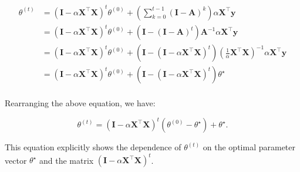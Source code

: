 \begin{align*}
    \theta^{(t)} & = (\mathbf{I} - \alpha \boldsymbol{X}^\top \boldsymbol{X})^t \theta^{(0)}  + \left( \sum_{k=0}^{t-1} (\boldsymbol{I} -  \mathbf{A})^k \right)  \alpha \boldsymbol{X} ^\top \boldsymbol{y}                                                              \\
                 & = (\mathbf{I} - \alpha \boldsymbol{X}^\top \boldsymbol{X})^t \theta^{(0)}  + (\mathbf{I}- (\mathbf{I} - \mathbf{A})^t) \mathbf{A}^{-1} \alpha \boldsymbol{X} ^\top \boldsymbol{y}                                                                      \\
                 & = (\mathbf{I} - \alpha \boldsymbol{X}^\top \boldsymbol{X})^t \theta^{(0)}  + (\mathbf{I}- (\mathbf{I} - \alpha \boldsymbol{X}^\top \boldsymbol{X})^t) \left(\frac{1}{\alpha} \bm{X}^\top \bm{X}\right)^{-1} \alpha \boldsymbol{X} ^\top \boldsymbol{y} \\
                 & = (\mathbf{I} - \alpha \boldsymbol{X}^\top \boldsymbol{X})^t \theta^{(0)}  + (\mathbf{I}- (\mathbf{I} - \alpha \boldsymbol{X}^\top \boldsymbol{X})^t) \theta^\star                                                                                     \\
\end{align*}


Rearranging the above equation, we have:

\[
    \theta^{(t)} = (\mathbf{I} - \alpha \boldsymbol{X}^\top \boldsymbol{X})^t (\theta^{(0)} - \theta^\star) + \theta^\star.
\]

This equation explicitly shows the dependence of \(\theta^{(t)}\) on the optimal parameter vector \(\theta^\star\) and the matrix \((\mathbf{I} - \alpha \boldsymbol{X}^\top \boldsymbol{X})^t\).

